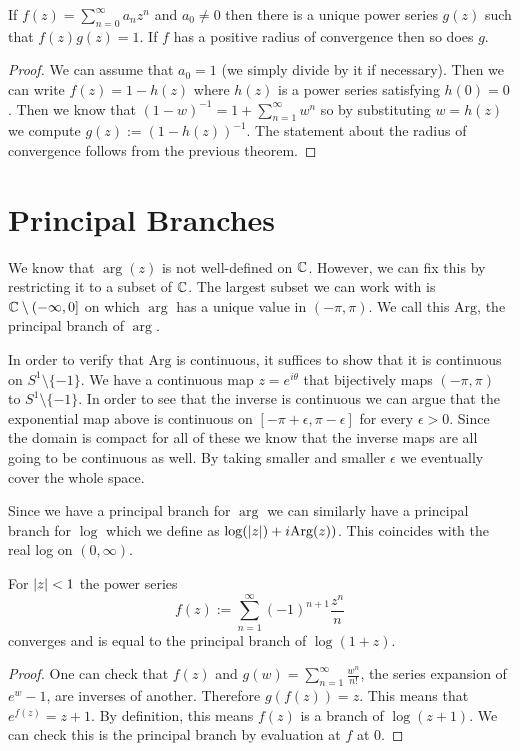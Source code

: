 \begin{theorem}
If $f(z) = \sum_{n = 0}^\infty a_n z^n$ and $a_0 \neq 0$ then there is a unique power series $g(z)$ such that $f(z) g(z) = 1$. If $f$ has a positive radius of convergence then so does $g$.
\end{theorem}
\begin{proof}
We can assume that $a_0 = 1$ (we simply divide by it if necessary). Then we can write $f(z) = 1 - h(z)$ where $h(z)$ is a power series satisfying $h(0) = 0$. Then we know that $(1 - w)^{-1} = 1 + \sum_{n = 1}^\infty w^n$ so by substituting $w = h(z)$ we compute $g(z) := (1 - h(z))^{-1}$. The statement about the radius of convergence follows from the previous theorem.
\end{proof}

\section{Principal Branches}
We know that $\arg(z)$ is not well-defined on $\mathbb{C}$. However, we can fix this by restricting it to a subset of $\mathbb{C}$. The largest subset we can work with is $\mathbb{C} \setminus (-\infty, 0]$ on which $\arg$ has a unique value in $(-\pi, \pi)$. We call this $\text{Arg}$, the principal branch of $\arg$. 

In order to verify that $\text{Arg}$ is continuous, it suffices to show that it is continuous on $S^1 \setminus \{-1\}$. We have a continuous map $z = e^{i\theta}$ that bijectively maps $(-\pi, \pi)$ to $S^1\setminus \{-1\}$. In order to see that the inverse is continuous we can argue that the exponential map above is continuous on $[-\pi + \epsilon, \pi - \epsilon]$ for every $\epsilon > 0$. Since the domain is compact for all of these we know that the inverse maps are all going to be continuous as well. By taking smaller and smaller $\epsilon$ we eventually cover the whole space.

Since we have a principal branch for $\arg$ we can similarly have a principal branch for $\log$ which we define as $\log(\left|z\right|) + i \text{Arg}(z))$. This coincides with the real log on $(0, \infty)$. 

\begin{proposition}
For $\left|z\right| < 1$ the power series
$$ f(z) := \sum_{n = 1}^\infty (-1)^{n + 1} \frac{z^n}{n} $$
converges and is equal to the principal branch of $\log(1 + z)$.
\end{proposition}
\begin{proof}
One can check that $f(z)$ and $g(w) = \sum_{n = 1}^\infty \frac{w^n}{n!}$, the series expansion of $e^w - 1$, are inverses of another. Therefore $g(f(z)) = z$. This means that $e^{f(z)} = z + 1$. By definition, this means $f(z)$ is a branch of $\log(z + 1)$. We can check this is the principal branch by evaluation at $f$ at 0. 
\end{proof}

